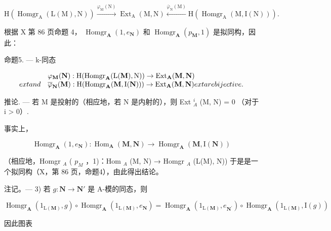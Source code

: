 \[
\mathrm{H} \left(\operatorname{Homgr} _ {\mathrm{A}} (\mathrm{L} (\mathrm{M}), \mathrm{N})\right) \xrightarrow {\varphi_ {\mathrm{M}} (\mathrm{N})} \operatorname{Ext} _ {\mathrm{A}} (\mathrm{M}, \mathrm{N}) \xleftarrow {\overline {{\varphi}} _ {\mathrm{N}} (\mathrm{M})} \mathrm{H} \left(\operatorname{Homgr} _ {\mathrm{A}} (\mathrm{M}, \mathrm{I} (\mathrm{N}))\right).
\]

根据 X 第 86 页命题 4， \(\operatorname{Homgr}_{\mathbf{A}}(1, e_{\mathbf{N}})\) 和 \(\operatorname{Homgr}_{\mathbf{A}}(p_{\mathbf{M}}, 1)\) 是拟同构，因此：

命题5. --- k-同态

\[
\begin{array}{l l} & \varphi_ {\mathbf {M}} (\mathbf {N}): \mathrm{H} (\mathrm{Homgr} _ {\mathbf {A}}   (\mathrm{L} (\mathbf {M}), \mathrm{N})) \to \mathrm{Ext} _ {\mathbf {A}}   (\mathbf {M}, \mathbf {N}) \\ 	ext{and} & \overline {{\varphi}} _ {\mathbf {N}} (\mathbf {M}): \mathrm{H} (\mathrm{Homgr} _ {\mathbf {A}}   (\mathbf {M}, \mathrm{I} (\mathbf {N}))) \to \mathrm{Ext} _ {\mathbf {A}}   (\mathbf {M}, \mathbf {N}) 	ext{are bijective.} \end{array}
\]

推论. --- 若 M 是投射的（相应地，若 N 是内射的），则 Ext \(_{A}^{i}\) (M, N) = 0 （对于 i \textgreater{} 0）.

事实上，

\[
\operatorname{Homgr} _ {\mathbf {A}} \left(1, e _ {\mathbf {N}}\right): \operatorname{Hom} _ {\mathbf {A}} (\mathbf {M}, \mathbf {N}) \rightarrow \operatorname{Homgr} _ {\mathbf {A}} (\mathbf {M}, \mathrm{I} (\mathbf {N}))
\]

（相应地，Homgr \(_{A}\) ( \(p_{M}\) ，1)：Hom \(_{A}\) (M, N) → Homgr \(_{A}\) (L(M), N)) 于是是一个拟同构（X，第 86 页，命题4），由此得出结论。

注记。--- 3) 若 \(g: \mathbf{N} \to \mathbf{N}'\) 是 A-模的同态，则

\[
\operatorname{Homgr} _ {\mathbf {A}} \left(1 _ {\mathrm{L} (\mathbf {M})}, g\right) \circ \operatorname{Homgr} _ {\mathbf {A}} \left(1 _ {\mathrm{L} (\mathbf {M})}, e _ {\mathbf {N}}\right) = \operatorname{Homgr} _ {\mathbf {A}} \left(1 _ {\mathrm{L} (\mathbf {M})}, e _ {\mathbf {N} ^ {\prime}}\right) \circ \operatorname{Homgr} _ {\mathbf {A}} \left(1 _ {\mathrm{L} (\mathbf {M})}, \mathrm{I} (g)\right)
\]

因此图表

